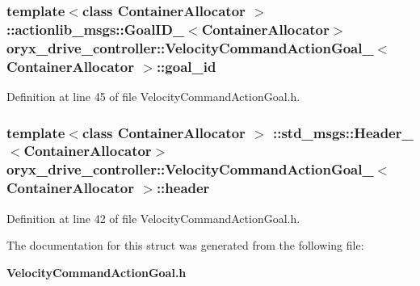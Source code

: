 \subsubsection[{goal\-\_\-id}]{\setlength{\rightskip}{0pt plus 5cm}template$<$class Container\-Allocator $>$ \-::actionlib\-\_\-msgs\-::\-Goal\-I\-D\-\_\-$<$\-Container\-Allocator$>$ {\bf oryx\-\_\-drive\-\_\-controller\-::\-Velocity\-Command\-Action\-Goal\-\_\-}$<$ \-Container\-Allocator $>$\-::{\bf goal\-\_\-id}}\label{structoryx__drive__controller_1_1VelocityCommandActionGoal___adad3ace16d082d768621da249063779d}


\-Definition at line 45 of file \-Velocity\-Command\-Action\-Goal.\-h.

\subsubsection[{header}]{\setlength{\rightskip}{0pt plus 5cm}template$<$class Container\-Allocator $>$ \-::std\-\_\-msgs\-::\-Header\-\_\-$<$\-Container\-Allocator$>$ {\bf oryx\-\_\-drive\-\_\-controller\-::\-Velocity\-Command\-Action\-Goal\-\_\-}$<$ \-Container\-Allocator $>$\-::{\bf header}}\label{structoryx__drive__controller_1_1VelocityCommandActionGoal___a99639bed06c4d1e71e7fd5400794aad8}


\-Definition at line 42 of file \-Velocity\-Command\-Action\-Goal.\-h.



\-The documentation for this struct was generated from the following file\-:\begin{DoxyCompactItemize}
\item 
{\bf \-Velocity\-Command\-Action\-Goal.\-h}\end{DoxyCompactItemize}
